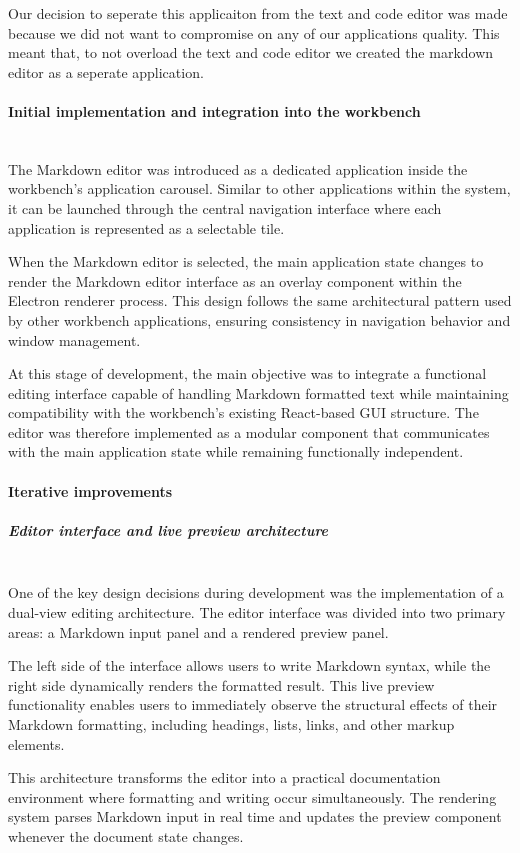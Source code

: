 \documentclass[a4paper,12pt]{article}
\begin{document}
Our decision to seperate this applicaiton from the text and code editor was made because we did not want to compromise on any of our applications quality. This meant that, to not overload the text and code editor we created the markdown editor as a seperate application. 

\paragraph{Initial implementation and integration into the workbench}\mbox{} \\
The Markdown editor was introduced as a dedicated application inside the workbench’s application carousel. Similar to other applications within the system, it can be launched through the central navigation interface where each application is represented as a selectable tile.

When the Markdown editor is selected, the main application state changes to render the Markdown editor interface as an overlay component within the Electron renderer process. This design follows the same architectural pattern used by other workbench applications, ensuring consistency in navigation behavior and window management.

At this stage of development, the main objective was to integrate a functional editing interface capable of handling Markdown formatted text while maintaining compatibility with the workbench’s existing React-based GUI structure. The editor was therefore implemented as a modular component that communicates with the main application state while remaining functionally independent.
\paragraph{Iterative improvements}
\subparagraph{Editor interface and live preview architecture}\mbox{} \\
One of the key design decisions during development was the implementation of a dual-view editing architecture. The editor interface was divided into two primary areas: a Markdown input panel and a rendered preview panel.

The left side of the interface allows users to write Markdown syntax, while the right side dynamically renders the formatted result. This live preview functionality enables users to immediately observe the structural effects of their Markdown formatting, including headings, lists, links, and other markup elements.

\newpage
This architecture transforms the editor into a practical documentation environment where formatting and writing occur simultaneously. The rendering system parses Markdown input in real time and updates the preview component whenever the document state changes.
\end{document}
